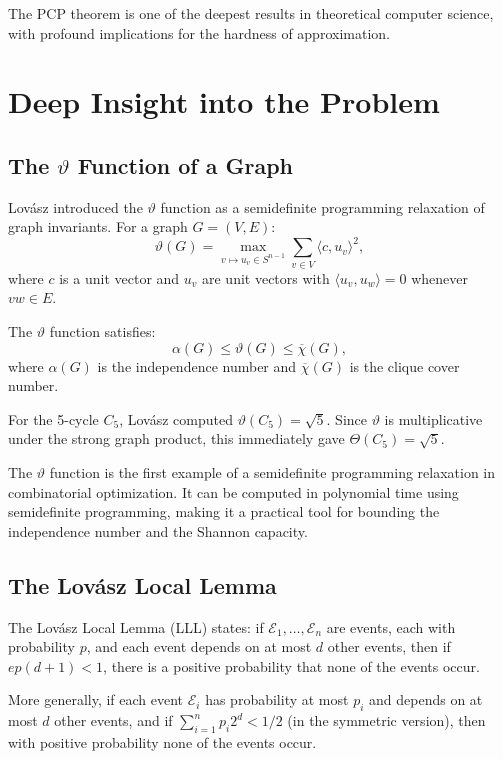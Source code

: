 The PCP theorem is one of the deepest results in theoretical computer science, with profound implications for the hardness of approximation.

\section{Deep Insight into the Problem}

\subsection{The $\vartheta$ Function of a Graph}

Lov\'asz introduced the $\vartheta$ function as a semidefinite programming relaxation of graph invariants. For a graph $G = (V,E)$:
\[
\vartheta(G) = \max_{v \mapsto u_v \in S^{n-1}} \sum_{v \in V} \langle c, u_v \rangle^2,
\]
where $c$ is a unit vector and $u_v$ are unit vectors with $\langle u_v, u_w \rangle = 0$ whenever $vw \in E$.

The $\vartheta$ function satisfies:
\[
\alpha(G) \leq \vartheta(G) \leq \overline{\chi}(G),
\]
where $\alpha(G)$ is the independence number and $\overline{\chi}(G)$ is the clique cover number.

For the 5-cycle $C_5$, Lov\'asz computed $\vartheta(C_5) = \sqrt{5}$. Since $\vartheta$ is multiplicative under the strong graph product, this immediately gave $\Theta(C_5) = \sqrt{5}$.

The $\vartheta$ function is the first example of a semidefinite programming relaxation in combinatorial optimization. It can be computed in polynomial time using semidefinite programming, making it a practical tool for bounding the independence number and the Shannon capacity.

\subsection{The Lov\'asz Local Lemma}

The Lov\'asz Local Lemma (LLL) states: if $\mathcal{E}_1, \ldots, \mathcal{E}_n$ are events, each with probability $p$, and each event depends on at most $d$ other events, then if $ep(d+1) < 1$, there is a positive probability that none of the events occur.

More generally, if each event $\mathcal{E}_i$ has probability at most $p_i$ and depends on at most $d$ other events, and if $\sum_{i=1}^n p_i 2^d < 1/2$ (in the symmetric version), then with positive probability none of the events occur.

